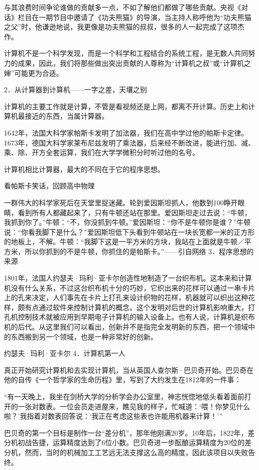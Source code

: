 \documentclass[12pt,UTF8]{ctexbook}
\begin{document}
与其浪费时间争论谁做的贡献多一点，不如了解他们都做了哪些贡献。央视《对话》栏目在一期节目中邀请了《功夫熊猫》的导演，当主持人称呼他为“功夫熊猫之父”时，他谦逊地说，我更像是功夫熊猫的叔叔，很多的人一起完成了这项杰作。

计算机不是一个科学发现，而是一个科学和工程结合的系统工程，是无数人共同努力的成果，因此，我们将那些做出突出贡献的人尊称为“计算机之叔”或“计算机之婶”可能更为合适。

2．从计算器到计算机——一字之差，天壤之别

计算机的主要工作就是计算，不管是看视频还是上网，都离不开计算。历史上和计算机最接近的东西，当属计算器。

1642年，法国大科学家帕斯卡发明了加法器，我们在高中学过他的帕斯卡定律。1673年，德国大科学家莱布尼兹发明了乘法器，后来经不断改进，能进行加、减、乘、除、开方全套运算，我们在大学学微积分时听过他的名号。

计算机相比计算器，最大的不同在于它的程序思想。

看帕斯卡笑话，回顾高中物理

一群伟大的科学家死后在天堂里捉迷藏。轮到爱因斯坦抓人，他数到100睁开眼睛，看到所有人都藏起来了，只有牛顿还站在那里。爱因斯坦走过去说：“牛顿，我抓到你了。”牛顿：“不，你没抓到牛顿。”爱因斯坦：“你不是牛顿你是谁？”牛顿说：“你看我脚下是什么？”爱因斯坦低下头看到牛顿站在一块长宽都一米的正方形的地板上，不解。牛顿：“我脚下这是一平方米的方块，我站在上面就是牛顿／平方米，所以你抓到的不是牛顿，你抓住的是帕斯卡。”——引自网络
3．程序思想的来源

1801年，法国人约瑟夫·玛利·亚卡尔创造性地制造了一台织布机。这本来和计算机没有什么关系，不过这台织布机十分的巧妙，它织出来的花样可以通过一串卡片上的孔来决定，人们事先在卡片上打孔来设计织物的花样，机器就可以织出这种花样，颇有点通过软件来控制计算机的概念。这个发明对后世的计算机影响重大，打孔机控制技术就被应用到早期电子计算机的输入设备上。也有人说，计算机是织布机的后代。从这里我们可以看出，创新并不是指完全发明新的东西，把一个领域中的东西搬到另一个领域，也是一种非常好的创新。

约瑟夫·玛利·亚卡尔
4．计算机第一人

真正开始研究计算机和去实现计算机，当从英国人查尔斯·巴贝奇开始。巴贝奇在他的自传《一个哲学家的生命历程》里，写到了大约发生在1812年的一件事：

“有一天晚上，我坐在剑桥大学的分析学会办公室里，神志恍惚地低头看着面前打开的一张对数表。一位会员走进屋来，瞧见我的样子，忙喊道：‘喂！你梦见什么啦？’我指着对数表回答说：‘我正在考虑这些表也许能用机器来计算！’”

巴贝奇的第一个目标是制作一台“差分机”，那年他刚满20岁。10年后，1822年，差分机初战告捷，运算精度达到了6位小数。巴贝奇进一步酝酿运算精度为20位的差分机，然而，当时的机械加工工艺远无法支撑这么高的精度，因此该项目以失败告终。
\end{document}
